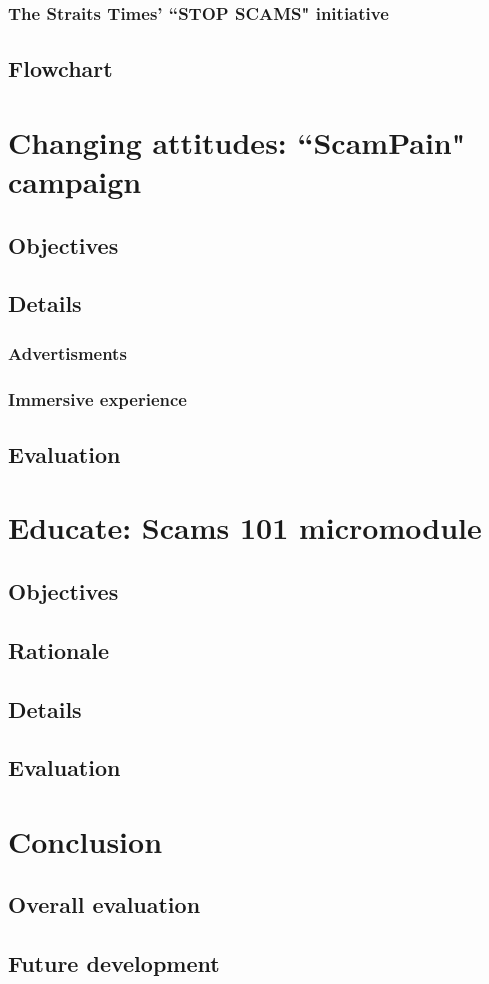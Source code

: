 \documentclass[a4paper]{article}
\begin{document}
\begin{multicols}{2}
	\subsubsection{The Straits Times' ``STOP SCAMS" initiative}
	\subsection{Flowchart}

	\section{Changing attitudes: ``ScamPain" campaign}
	\subsection{Objectives}
	\subsection{Details}
	\subsubsection{Advertisments}
	\subsubsection{Immersive experience}
	\subsection{Evaluation}

	\section{Educate: Scams 101 micromodule}
	\subsection{Objectives}
	\subsection{Rationale}
	\subsection{Details}
	\subsection{Evaluation}

	\section{Conclusion}
	\subsection{Overall evaluation}
	\subsection{Future development}

\end{multicols}
\end{document}
